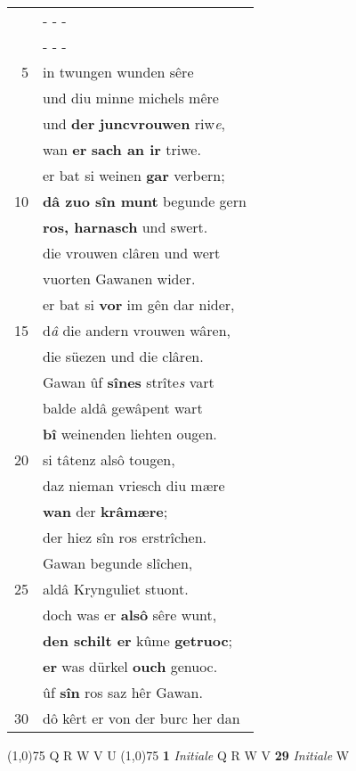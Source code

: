 \documentclass[8pt,a4paper,notitlepage]{article}
\begin{document}
\begin{table}[ht]
\begin{minipage}[t]{0.5\linewidth}
\begin{tabular}{rl}
 & \multicolumn{1}{l}{ - - - }\\ 
 & \multicolumn{1}{l}{ - - - }\\ 
5 & in twungen wunden sêre\\ 
 & und diu minne michels mêre\\ 
 & und \textbf{der} \textbf{juncvrouwen} riw\textit{e},\\ 
 & wan \textbf{er} \textbf{sach an ir} triwe.\\ 
 & er bat si weinen \textbf{gar} verbern;\\ 
10 & \textbf{dâ zuo sîn munt} begunde gern\\ 
 & \textbf{ros, harnasch} und swert.\\ 
 & die vrouwen clâren und wert\\ 
 & vuorten Gawanen wider.\\ 
 & er bat si \textbf{vor} im gên dar nider,\\ 
15 & d\textit{â} die andern vrouwen wâren,\\ 
 & die süezen und die clâren.\\ 
 & Gawan ûf \textbf{sînes} strîte\textit{s} vart\\ 
 & balde aldâ gewâpent wart\\ 
 & \textbf{bî} weinenden liehten ougen.\\ 
20 & si tâtenz alsô tougen,\\ 
 & daz nieman vriesch diu mære\\ 
 & \textbf{wan} der \textbf{krâmære};\\ 
 & der hiez sîn ros erstrîchen.\\ 
 & Gawan begunde slîchen,\\ 
25 & aldâ Krynguliet stuont.\\ 
 & doch was er \textbf{alsô} sêre wunt,\\ 
 & \textbf{den schilt er} kûme \textbf{getruoc};\\ 
 & \textbf{er} was dürkel \textbf{ouch} genuoc.\\ 
 & ûf \textbf{sîn} ros saz hêr Gawan.\\ 
30 & dô kêrt er von der burc her dan\\ 
\end{tabular}
\scriptsize
\line(1,0){75} \newline
Q R W V U \newline
\line(1,0){75} \newline
\textbf{1} \textit{Initiale} Q R W V  \textbf{29} \textit{Initiale} W  \newline

\end{minipage}
\end{table}
\end{document}
